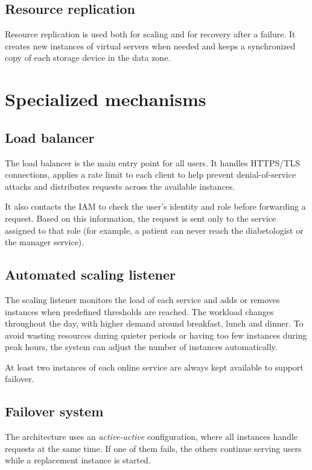 \subsection{Resource replication}

Resource replication is used both for scaling and for recovery after a failure.
It creates new instances of virtual servers when needed and keeps a synchronized
copy of each storage device in the data zone.

\section{Specialized mechanisms}

\subsection{Load balancer}

The load balancer is the main entry point for all users. It handles HTTPS/TLS
connections, applies a rate limit to each client to help prevent denial-of-service
attacks and distributes requests across the available instances.

It also contacts the IAM to check the user's identity and role before forwarding
a request. Based on this information, the request is sent only to the service
assigned to that role (for example, a patient can never reach the diabetologist or the manager service).

\subsection{Automated scaling listener}


The scaling listener monitors the load of each service and adds or removes
instances when predefined thresholds are reached. The workload changes
throughout the day, with higher demand around breakfast, lunch and dinner.
To avoid wasting resources during quieter periods or having too few instances
during peak hours, the system can adjust the number of instances automatically.

At least two instances of each online service are always kept
available to support failover.

\subsection{Failover system}


The architecture uses an \textit{active-active} configuration, where all instances
handle requests at the same time. If one of them fails, the others continue
serving users while a replacement instance is started. 

